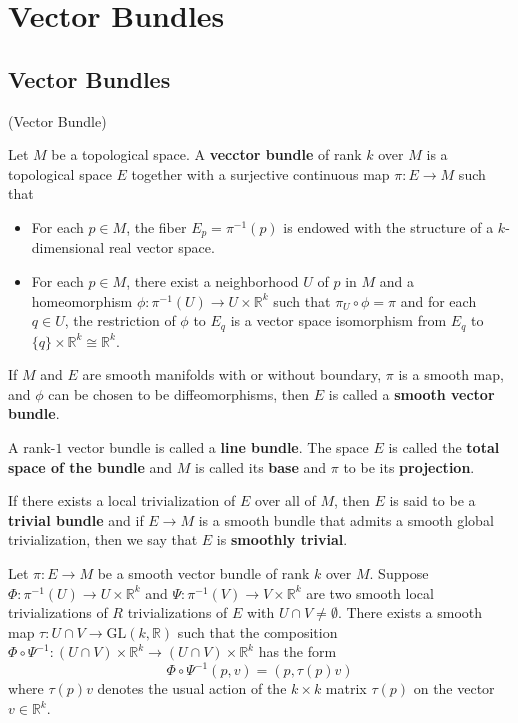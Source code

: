 \section{Vector Bundles}

\subsection{Vector Bundles}

\begin{definition}(Vector Bundle)\par
    Let $M$ be a topological space. A \textbf{vecctor bundle} of rank $k$ over $M$ is a topological space $E$ together with a surjective continuous map $\pi:E\to M$ such that
    \begin{itemize}
        \item For each $p\in M$, the fiber $E_p = \pi^{-1}(p)$ is endowed with the structure of a $k$-dimensional real vector space.
        \item For each $p\in M$, there exist a neighborhood $U$ of $p$ in $M$ and a homeomorphism $\phi:\pi^{-1}(U) \to U \times\mathbb{R}^k$ such that $\pi_U\circ \phi = \pi$ and for each $q\in U$, the restriction of $\phi$ to $E_q$ is a vector space isomorphism from $E_q$ to $\{q\} \times \mathbb{R}^k \cong \mathbb{R}^k$.
    \end{itemize}\par
    If $M$ and $E$ are smooth manifolds with or without boundary, $\pi$ is a smooth map, and $\phi$ can be chosen to be diffeomorphisms, then $E$ is called a \textbf{smooth vector bundle}.\par
    A rank-$1$ vector bundle is called a \textbf{line bundle}. The space $E$ is called the \textbf{total space of the bundle} and $M$ is called its \textbf{base} and $\pi$ to be its \textbf{projection}.\par
    If there exists a local trivialization of $E$ over all of $M$, then $E$ is said to be a \textbf{trivial bundle} and if $E\to M$ is a smooth bundle that admits a smooth global trivialization, then we say that $E$ is \textbf{smoothly trivial}.  
\end{definition}

\begin{lemma}
    Let $\pi:E\to M$ be a smooth vector bundle of rank $k$ over $M$. Suppose $\Phi:\pi^{-1}(U) \to U\times\mathbb{R}^k$ and $\Psi:\pi^{-1}(V) \to V\times\mathbb{R}^k$ are two smooth local trivializations of $R$ trivializations of $E$ with $U\cap V\neq \emptyset$. There exists a smooth map $\tau:U\cap V \to \text{GL}(k,\mathbb{R})$ such that the composition $\Phi\circ\Psi^{-1}:(U\cap V)\times \mathbb{R}^k \to (U\cap V)\times \mathbb{R}^k$ has the form
    \[\Phi\circ\Psi^{-1}(p,v) = (p,\tau(p)v)\]
    where $\tau(p)v$ denotes the usual action of the $k\times k$ matrix $\tau(p)$ on the vector $v\in\mathbb{R}^k$.
\end{lemma}

